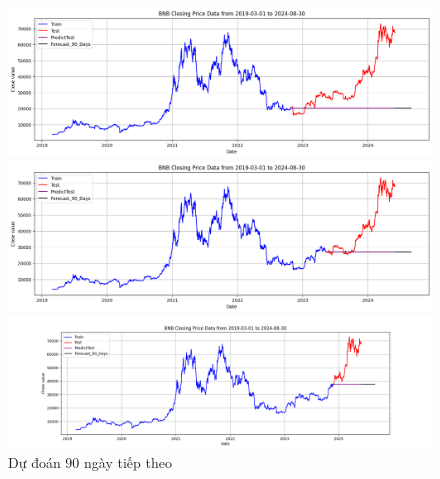 \documentclass[conference]{IEEEtran}
\begin{document}
\begin{figure}[H]
    \centering
    \begin{minipage}{0.15\textwidth}
    \centering
    \includegraphics[width=1\textwidth]{Figure/ARIMA_BTC_90days_73.png}
    \end{minipage}
    \hfill
    \begin{minipage}{0.15\textwidth}
    \centering
    \includegraphics[width=1\textwidth]{Figure/ARIMA_BTC_90days_82.png}
    \end{minipage}
    \hfill
    \begin{minipage}{0.15\textwidth}
    \centering
    \includegraphics[width=1\textwidth]{Figure/ARIMA_BTC_90days_91.png}
    \end{minipage}
    \caption{Dự đoán 90 ngày tiếp theo}
    \label{fig:1}
\end{figure}
\end{document}
